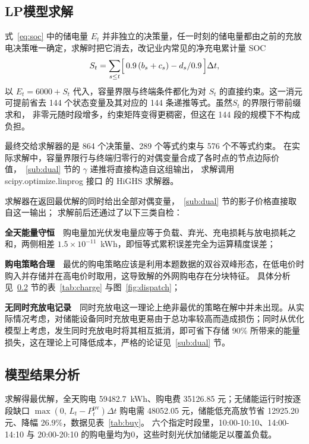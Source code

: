 \documentclass[zihao=-4,a4paper,fontset=none]{ctexart}
\begin{document}
\subsection{LP模型求解}
\label{sub:solve}

式~\eqref{eq:soc} 中的储电量 $E_t$ 并非独立的决策量，任一时刻的储电量都由之前的充放电决策唯一确定，求解时把它消去，改记业内常见的净充电累计量 SOC
\begin{equation}
S_t=\sum_{s\le t}\Bigl[\,0.9\,(b_s+c_s)-d_s/0.9\,\Bigr]\Delta t ,
\label{eq:cum}
\end{equation}
以 $E_t=6000+S_t$ 代入，容量界限与终端条件都化为对 $S_t$ 的直接约束。这一消元可提前省去 144 个状态变量及其对应的 144 条递推等式。虽然$S_t$ 的界限行带前缀求和，
非零元随时段增多，约束矩阵变得更稠密，但这在 144 段的规模下不构成负担。

最终交给求解器的是 864 个决策量、289 个等式约束与 576 个不等式约束。
在实际求解中，容量界限行与终端归零行的对偶变量合成了各时点的节点边际价值，~\ref{sub:dual} 节的 $\gamma$ 递推将直接构造自这组输出，
求解调用 scipy.optimize.linprog 接口
的 HiGHS 求解器。

求解器在返回最优解的同时给出全部对偶变量，~\ref{sub:dual} 节的影子价格直接取自这一输出；
求解前后还通过了以下三类自检：

\textbf{全天能量守恒}\ \ 购电量加光伏发电量应等于负载、弃光、充电损耗与放电损耗之和，两侧相差 $1.5\times10^{-11}$~kWh，即恒等式累积误差完全为运算精度误差；

\textbf{购电策略合理}\ \ 最优的购电策略应该是利用本题数据的双谷双峰形态，在低电价时购入并存储并在高电价时取用，这导致解的外网购电存在分块特征。
具体分析见~\ref{sub:results} 节的表~\ref{tab:charge} 与图~\ref{fig:dispatch}；

\textbf{无同时充放电记录}\ \ 同时充放电这一理论上绝非最优的策略在解中并未出现。从实际情况考虑，对储能设备同时充放电更易由于总功率较高而造成损伤；同时从优化模型上考虑，发生同时充放电时将其相互抵消，即可省下存储 90\% 所带来的能量损失，这在理论上可降低成本，严格的论证见~\ref{sub:dual} 节。
\subsection{模型结果分析}
\label{sub:results}

求解得最优解，全天购电 59482.7~kWh、购电费 35126.85 元；无储能运行时按逐段缺口 $\max(0,\,L_t-P_t^{\mathrm{pv}})\Delta t$ 购电需 48052.05 元，储能低充高放节省 12925.20 元、降幅 26.9\%，数据见表~\ref{tab:buy}。
六个指定时段里，10:00-10:10、14:00-14:10 与 20:00-20:10 的购电量均为0，这些时刻光伏加储能足以覆盖负载。
\end{document}
